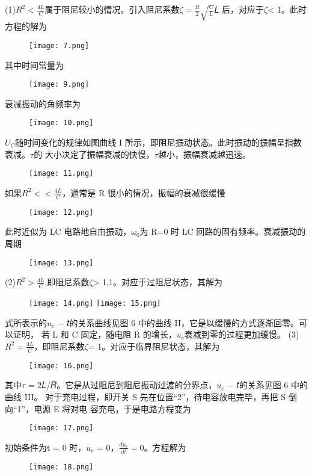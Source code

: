\documentclass[11pt,a4paper]{article}
\begin{document}
(1)$R^2<\frac{4L}{C}$属于阻尼较小的情况。引入阻尼系数$\zeta  =\frac{R}{2}\sqrt{\frac{C}{L}} $𝐿
后，对应于$\zeta $< 1。此时方程的解为
\begin{figure}[H]
    \centering
    \texttt{[image: 7.png]}
\end{figure}
其中时间常量为
\begin{figure}[H]
    \centering
    \texttt{[image: 9.png]}
\end{figure}
衰减振动的角频率为
\begin{figure}[H]
    \centering
    \texttt{[image: 10.png]}
\end{figure}
$U_C$随时间变化的规律如图曲线 I 所示，即阻尼振动状态。此时振动的振幅呈指数衰减。$\tau $的
大小决定了振幅衰减的快慢，$\tau $越小，振幅衰减越迅速。
\begin{figure}[H]
    \centering
    \texttt{[image: 11.png]}
\end{figure}
如果$R^2<<\frac{4L}{C}$，通常是 R 很小的情况，振幅的衰减很缓慢
\begin{figure}[H]
    \centering
    \texttt{[image: 12.png]}
\end{figure}
此时近似为 LC 电路地自由振动，$\omega _0$为 R=0 时 LC 回路的固有频率。衰减振动的周期
\begin{figure}[H]
    \centering
    \texttt{[image: 13.png]}
\end{figure}
(2)$R^2>\frac{4L}{C}$,即阻尼系数$\zeta $> 1,1。对应于过阻尼状态，其解为
\begin{figure}[H]
    \centering
    \texttt{[image: 14.png]}
    \texttt{[image: 15.png]}
\end{figure}
式所表示的$u_c$ − 𝑡的关系曲线见图 6 中的曲线 II，它是以缓慢的方式逐渐回零。可以证明，
若 L 和 C 固定，随电阻 R 的增长，$u_c$衰减到零的过程更加缓慢。
(3)$R^2=\frac{4L}{C}$，即阻尼系数$\zeta $= 1。对应于临界阻尼状态，其解为
\begin{figure}[H]
    \centering
    \texttt{[image: 16.png]}
\end{figure}
其中$\tau $ = 2𝐿/𝑅。它是从过阻尼到阻尼振动过渡的分界点，$u_c$ − 𝑡的关系见图 6 中的曲线 III。
对于充电过程，即开关 S 先在位置“2”，待电容放电完毕，再把 S 倒向“1”，电源 E 将对电
容充电，于是电路方程变为
\begin{figure}[H]
    \centering
    \texttt{[image: 17.png]}
\end{figure}
初始条件为t = 0 时，$u_c$ = 0，$\frac{d{u_c}}{dt} = 0$。方程解为
\begin{figure}[H]
    \centering
    \texttt{[image: 18.png]}
\end{figure}
\end{document}
